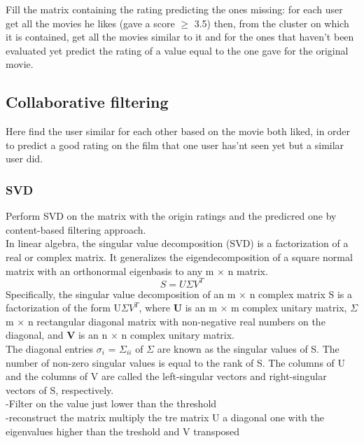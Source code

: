 \documentclass{article}
\begin{document}
Fill the matrix containing the rating predicting the ones missing:
for each user get all the movies he likes (gave a score $\ge$ 3.5) 
then, from the cluster on which it is contained, get all the movies similar to it and for the ones that haven't been evaluated yet predict the rating of a value equal to the one gave for the original movie.

\subsection{Collaborative filtering}
Here find the user similar for each other based on the movie both liked, in order to predict a good rating on the film that one user has'nt seen yet but a similar user did.
\subsubsection{SVD}
Perform SVD on the matrix with the origin ratings and the predicred one by content-based filtering approach.\\
In linear algebra, the singular value decomposition (SVD) is a factorization of a real or complex matrix. It generalizes the eigendecomposition of a square normal matrix with an orthonormal eigenbasis to any m × n matrix.
\begin{equation}
      S = U\Sigma V^T
\end{equation}
Specifically, the singular value decomposition of an m $\times$ n complex matrix S is a factorization of the form U$\Sigma V^T$, where \textbf{U} is an m $\times$ m complex unitary matrix, \textbf{$\Sigma$} m $\times$ n rectangular diagonal matrix with non-negative real numbers on the diagonal, and \textbf{V} is an n $\times$ n complex unitary matrix.\\
The diagonal entries $\sigma _{i}$ = $\Sigma _{ii}$ of $\Sigma$ are known as the singular values of S. The number of non-zero singular values is equal to the rank of S. The columns of U and the columns of V are called the left-singular vectors and right-singular vectors of S, respectively.\\
-Filter on the value just lower than the threshold\\
-reconstruct the matrix multiply the tre matrix U a diagonal one with the \\eigenvalues higher than the treshold and V transposed\\


\newpage

\end{document}
